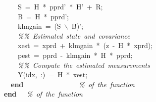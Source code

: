 \documentclass{article}\usepackage{graphicx, color}
\newcommand{\hlstd}[1]{\textcolor[rgb]{0,0,0}{#1}}%
\newcommand{\hlslc}[1]{\textcolor[rgb]{0.51,0.51,0.51}{\it{#1}}}
\newcommand{\hlkwa}[1]{\textcolor[rgb]{0,0,0}{\bf{#1}}}
\newcommand{\hlopt}[1]{\textcolor[rgb]{0,0,0}{#1}}
\begin{document}
\hlstd{}\hlstd{\ \ \ \ }\hlstd{S\ }\hlopt{=\ }\hlstd{H\ }\hlopt{{*}\ }\hlstd{p\textunderscore prd'\ }\hlopt{{*}\ }\hlstd{H'\ }\hlopt{+\ }\hlstd{R}\hlopt{;}\hspace*{\fill}\\
\hlstd{}\hlstd{\ \ \ \ }\hlstd{B\ }\hlopt{=\ }\hlstd{H\ }\hlopt{{*}\ }\hlstd{p\textunderscore prd'}\hlopt{;}\hspace*{\fill}\\
\hlstd{}\hlstd{\ \ \ \ }\hlstd{klm\textunderscore gain\ }\hlopt{=\ (}\hlstd{S\ $\backslash$\ B}\hlopt{)}\hlstd{'}\hlopt{;}\hspace*{\fill}\\
\hlstd{}\hlstd{\ \ \ \ }\hlstd{}\hlslc{\%\%\ Estimated\ state\ and\ covariance}\hspace*{\fill}\\
\hlstd{}\hlstd{\ \ \ \ }\hlstd{x\textunderscore est\ }\hlopt{=\ }\hlstd{x\textunderscore prd\ }\hlopt{+\ }\hlstd{klm\textunderscore gain\ }\hlopt{{*}\ (}\hlstd{z\ }\hlopt{{-}\ }\hlstd{H\ }\hlopt{{*}\ }\hlstd{x\textunderscore prd}\hlopt{);}\hspace*{\fill}\\
\hlstd{}\hlstd{\ \ \ \ }\hlstd{p\textunderscore est\ }\hlopt{=\ }\hlstd{p\textunderscore prd\ }\hlopt{{-}\ }\hlstd{klm\textunderscore gain\ }\hlopt{{*}\ }\hlstd{H\ }\hlopt{{*}\ }\hlstd{p\textunderscore prd}\hlopt{;}\hspace*{\fill}\\
\hlstd{}\hlstd{\ \ \ \ }\hlstd{}\hlslc{\%\%\ Compute\ the\ estimated\ measurements}\hspace*{\fill}\\
\hlstd{}\hlstd{\ \ \ \ }\hlstd{Y}\hlopt{(}\hlstd{idx}\hlopt{,\ :)\ =\ }\hlstd{H\ }\hlopt{{*}\ }\hlstd{x\textunderscore est}\hlopt{;}\hspace*{\fill}\\
\hlstd{}\hlstd{\ \ }\hlstd{}\hlkwa{end}\hlstd{\ \ \ \ \ \ \ \ \ \ \ \ \ \ \ \ }\hlkwa{}\hlstd{}\hlslc{\%\ of\ the\ function}\hspace*{\fill}\\
\hlstd{}\hlkwa{end}\hlstd{\ \ \ }\hlkwa{}\hlstd{}\hlslc{\%\ of\ the\ function}\hlstd{}\hspace*{\fill}\\
\mbox{}
\normalfont
\normalsize
\end{document}
